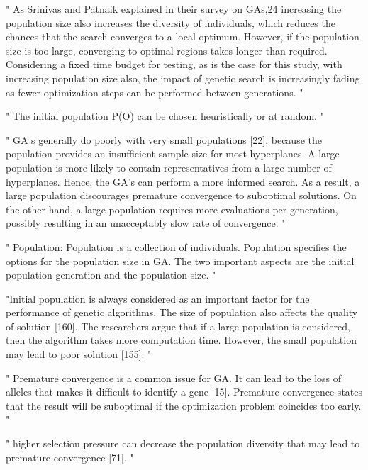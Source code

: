 "
As Srinivas and Patnaik explained in their survey on GAs,24 increasing the population size also increases the diversity of individuals, which reduces the chances that the search converges to a local optimum. However, if the population size is too large, converging to optimal regions takes longer than required. Considering a fixed time budget for testing, as is the case for this study, with increasing population size also, the impact of genetic search is increasingly fading as fewer optimization steps can be performed between generations.
"\cite{klampfl_using_nodate}



"
The initial population P(O) can be chosen heuristically or at random.
"\cite{grefenstette_optimization_1986}

"
GA s generally do poorly with very small populations [22], because the population provides an insufficient sample size for most hyperplanes. A large population is more likely to contain representatives from a large number of hyperplanes. Hence, the GA's can perform a more informed search. As a result, a large population discourages premature convergence to suboptimal solutions. On the other hand, a large population requires more evaluations per generation, possibly resulting in an unacceptably slow rate of convergence.
"\cite{grefenstette_optimization_1986}


"
Population: Population is a collection of individuals. Population specifies the options for the population size in GA. The two important aspects are the initial population generation and the population size.
"\cite{majumdar_genetic_2015}


"Initial population is always considered as an important factor for the performance of genetic algorithms. The size of population also affects the quality of solution [160]. The researchers argue that if a large population is considered, then the algorithm takes more computation time. However, the small population may lead to poor solution [155].
"\cite{katoch_review_2021}

"
Premature convergence is a common issue for GA. It can lead to the loss of alleles that makes it difficult to identify a gene [15]. Premature convergence states that the result will be suboptimal if the optimization problem coincides too early.
"\cite{katoch_review_2021}

"
higher selection pressure can decrease the population diversity that may lead to premature convergence [71].
"\cite{katoch_review_2021}


